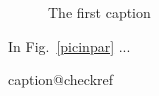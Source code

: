 \documentclass{article}
\begin{document}
\begin{figure}[!ht]
\caption{The first caption}
\end{figure}
\begin{figwindow}
\lipsum[1]

In Fig.~\ref{picinpar} ...
\end{figwindow}
\csname caption@checkref
\end{document}
